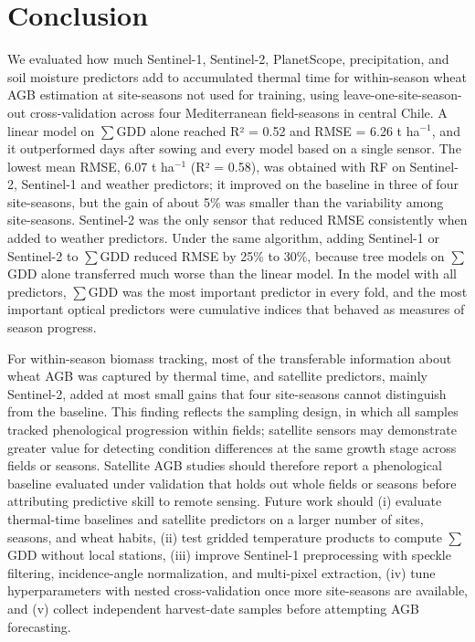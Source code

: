 \documentclass[
  british,
]{interact}
\begin{document}
\section{Conclusion}\label{conclusion}

We evaluated how much Sentinel-1, Sentinel-2, PlanetScope,
precipitation, and soil moisture predictors add to accumulated thermal
time for within-season wheat AGB estimation at site-seasons not used for
training, using leave-one-site-season-out cross-validation across four
Mediterranean field-seasons in central Chile. A linear model on
\(\sum\)GDD alone reached R² = 0.52 and RMSE = 6.26 t ha\(^{-1}\), and
it outperformed days after sowing and every model based on a single
sensor. The lowest mean RMSE, 6.07 t ha\(^{-1}\) (R² = 0.58), was
obtained with RF on Sentinel-2, Sentinel-1 and weather predictors; it
improved on the baseline in three of four site-seasons, but the gain of
about 5\% was smaller than the variability among site-seasons.
Sentinel-2 was the only sensor that reduced RMSE consistently when added
to weather predictors. Under the same algorithm, adding Sentinel-1 or
Sentinel-2 to \(\sum\)GDD reduced RMSE by 25\% to 30\%, because tree
models on \(\sum\)GDD alone transferred much worse than the linear
model. In the model with all predictors, \(\sum\)GDD was the most
important predictor in every fold, and the most important optical
predictors were cumulative indices that behaved as measures of season
progress.

For within-season biomass tracking, most of the transferable information
about wheat AGB was captured by thermal time, and satellite predictors,
mainly Sentinel-2, added at most small gains that four site-seasons
cannot distinguish from the baseline. This finding reflects the sampling
design, in which all samples tracked phenological progression within
fields; satellite sensors may demonstrate greater value for detecting
condition differences at the same growth stage across fields or seasons.
Satellite AGB studies should therefore report a phenological baseline
evaluated under validation that holds out whole fields or seasons before
attributing predictive skill to remote sensing. Future work should (i)
evaluate thermal-time baselines and satellite predictors on a larger
number of sites, seasons, and wheat habits, (ii) test gridded
temperature products to compute \(\sum\)GDD without local stations,
(iii) improve Sentinel-1 preprocessing with speckle filtering,
incidence-angle normalization, and multi-pixel extraction, (iv) tune
hyperparameters with nested cross-validation once more site-seasons are
available, and (v) collect independent harvest-date samples before
attempting AGB forecasting.
\end{document}
